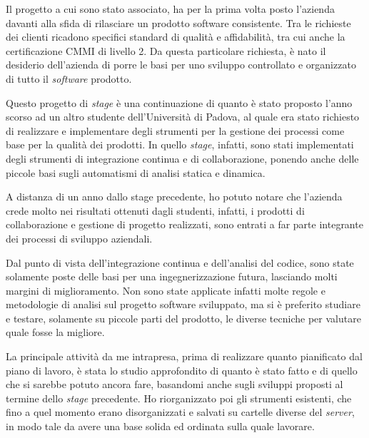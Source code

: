 Il progetto a cui sono stato associato, ha per la prima volta posto l'azienda davanti alla sfida di rilasciare un prodotto software consistente. Tra le richieste dei clienti ricadono specifici standard di qualità e affidabilità, tra cui anche la certificazione CMMI di livello 2. Da questa particolare richiesta, è nato il desiderio dell'azienda di porre le basi per uno sviluppo controllato e organizzato di tutto il \textit{software} prodotto.



Questo progetto di \textit{stage} è una continuazione di quanto è stato proposto l'anno scorso ad un altro studente dell'Università di Padova, al quale era stato richiesto di realizzare e implementare degli strumenti per la gestione dei processi come base per la qualità dei prodotti. In quello \textit{stage}, infatti, sono stati implementati degli strumenti di integrazione continua e di collaborazione, ponendo anche delle piccole basi sugli automatismi di analisi statica e dinamica.

A distanza di un anno dallo stage precedente, ho potuto notare che l'azienda crede molto nei risultati ottenuti dagli studenti, infatti, i prodotti di collaborazione e gestione di progetto realizzati, sono entrati a far parte integrante dei processi di sviluppo aziendali.

Dal punto di vista dell'integrazione continua e dell'analisi del codice, sono state solamente poste delle basi per una ingegnerizzazione futura, lasciando molti margini di miglioramento. Non sono state applicate infatti molte regole e metodologie di analisi sul progetto software sviluppato, ma si è preferito studiare e testare, solamente su piccole parti del prodotto, le diverse tecniche per valutare quale fosse la migliore.

La principale attività da me intrapresa, prima di realizzare quanto pianificato dal piano di lavoro, è stata lo studio approfondito di quanto è stato fatto e di quello che si sarebbe potuto ancora fare, basandomi anche sugli sviluppi proposti al termine dello \textit{stage} precedente. Ho riorganizzato poi gli strumenti esistenti, che fino a quel momento erano disorganizzati e salvati su cartelle diverse del \textit{server}, in modo tale da avere una base solida ed ordinata sulla quale lavorare.



